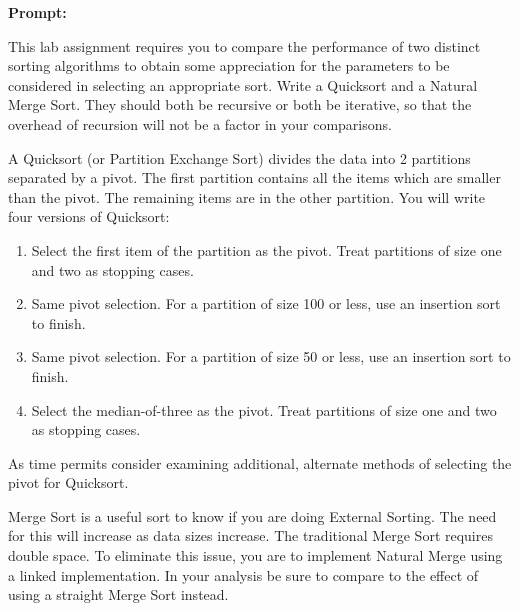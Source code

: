 \documentclass[10pt,letterpaper,final]{report}
\begin{document}
\begin{center}
  \vline
\end{center}

\nopagebreak{}

\pagebreak
\noindent\textbf{Prompt:}

This lab assignment requires you to compare the performance of two distinct sorting algorithms to obtain some appreciation for the parameters to be considered in selecting an appropriate sort. Write a Quicksort and a Natural Merge Sort. They should both be recursive or both be iterative, so that the overhead of recursion will not be a factor in your comparisons.

A Quicksort (or Partition Exchange Sort) divides the data into 2 partitions separated by a pivot. The first partition contains all the items which are smaller than the pivot. The remaining items are in the other partition. You will write four versions of Quicksort:
\begin{enumerate}
  \item Select the first item of the partition as the pivot. Treat partitions of size one and two as stopping cases.
  \item Same pivot selection. For a partition of size 100 or less, use an insertion sort to finish.
  \item Same pivot selection. For a partition of size 50 or less, use an insertion sort to finish.
  \item Select the median-of-three as the pivot. Treat partitions of size one and two as stopping cases.
\end{enumerate}

As time permits consider examining additional, alternate methods of selecting the pivot for Quicksort.

Merge Sort is a useful sort to know if you are doing External Sorting. The need for this will increase as data sizes increase. The traditional Merge Sort requires double space. To eliminate this issue, you are to implement Natural Merge using a linked implementation. In your analysis be sure to compare to the effect of using a straight Merge Sort instead.
\end{document}
